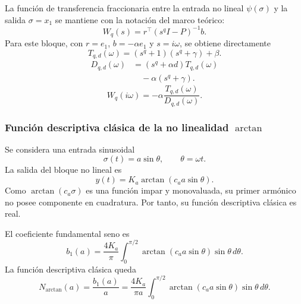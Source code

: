\documentclass[journal]{IEEEtran}
\begin{document}
La función de transferencia fraccionaria entre la entrada no lineal
\(\psi(\sigma)\) y la salida \(\sigma=x_1\) se mantiene con la notación del
marco teórico:
\begin{equation}
\label{eq:W_arctan_def}
W_q(s)
=
r^\top(s^q I-P)^{-1}b.
\end{equation}
Para este bloque, con \(r=e_1\), \(b=-\alpha e_1\) y \(s=i\omega\), se obtiene
directamente
\begin{equation}
\label{eq:Tq_arctan_machado}
T_{q,d}(\omega)
=
\left(s^q+1\right)\left(s^q+\gamma\right)+\beta.
\end{equation}
\begin{equation}
\label{eq:Dq_arctan_machado}
\begin{aligned}
D_{q,d}(\omega)
&=
\left(s^q+\alpha d\right)T_{q,d}(\omega)\\
&\quad-\alpha\left(s^q+\gamma\right).
\end{aligned}
\end{equation}
\begin{equation}
\label{eq:Wq_arctan_freq}
W_q(i\omega)
=
-\alpha\frac{T_{q,d}(\omega)}{D_{q,d}(\omega)}.
\end{equation}

\subsubsection{Función descriptiva clásica de la no linealidad \texorpdfstring{\(\arctan\)}{arctan}}

Se considera una entrada sinusoidal
\[
\sigma(t)=a\sin\theta,
\qquad
\theta=\omega t.
\]
La salida del bloque no lineal es
\[
y(t)
=
K_a\arctan(c_a a\sin\theta).
\]
Como \(\arctan(c_a\sigma)\) es una función impar y monovaluada, su primer
armónico no posee componente en cuadratura. Por tanto, su función descriptiva
clásica es real.

El coeficiente fundamental seno es
\begin{equation}
\label{eq:b1_arctan}
b_1(a)
=
\frac{4K_a}{\pi}
\int_0^{\pi/2}
\arctan(c_a a\sin\theta)\sin\theta\,d\theta.
\end{equation}
La función descriptiva clásica queda
\begin{equation}
\label{eq:N_arctan_integral}
N_{\arctan}(a)
=
\frac{b_1(a)}{a}
=
\frac{4K_a}{\pi a}
\int_0^{\pi/2}
\arctan(c_a a\sin\theta)\sin\theta\,d\theta.
\end{equation}
\end{document}
